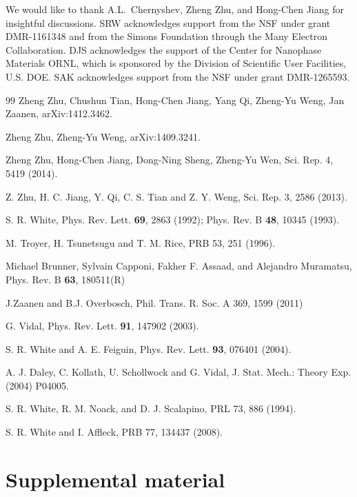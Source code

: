 \documentclass[aps,prb,twocolumn]{revtex4}
\begin{document}
We would like to thank A.L.~Chernyshev, 
%
Zheng Zhu, and Hong-Chen Jiang
for insightful discussions. SRW acknowledges support from
the NSF under grant DMR-1161348 and from the Simons Foundation through the Many Electron Collaboration. 
DJS acknowledges the support of the Center for 
Nanophase Materials
ORNL, which is sponsored by the Division of Scientific User Facilities, U.S. DOE.
SAK acknowledges support from the NSF under grant DMR-1265593.

\begin{thebibliography}{99}
  Zheng Zhu, Chushun Tian, Hong-Chen Jiang, Yang Qi, Zheng-Yu Weng, Jan Zaanen, arXiv:1412.3462.

  Zheng Zhu, Zheng-Yu Weng, arXiv:1409.3241.

 Zheng Zhu, Hong-Chen Jiang, Dong-Ning Sheng, Zheng-Yu Wen,  Sci. Rep. 4, 5419 (2014).

  Z. Zhu, H. C. Jiang, Y. Qi, C. S. Tian and Z. Y. Weng, Sci. Rep. 3, 2586 (2013).

 S. R. White, Phys. Rev. Lett. {\bf 69}, 2863 (1992); Phys. Rev. B {\bf 48}, 10345 (1993).

 M. Troyer, H. Tsunetsugu and T. M. Rice, PRB 53, 251 (1996).

 Michael Brunner, Sylvain Capponi, Fakher F. Assaad, and Alejandro Muramatsu, 
Phys. Rev. B {\bf 63}, 180511(R)

 J.Zaanen and B.J. Overbosch, Phil. Trans. R. Soc. A 369, 1599 (2011)

 G. Vidal, Phys. Rev. Lett. {\bf 91}, 147902 (2003).

 S. R. White and A. E. Feiguin, Phys. Rev. Lett. {\bf 93}, 076401 (2004).

 A. J. Daley, C. Kollath, U. Schollwock and G. Vidal, J. Stat. Mech.: Theory Exp. (2004) P04005.


 S. R. White, R. M. Noack, and D. J. Scalapino, PRL 73, 886 (1994).

 S. R. White and I. Affleck, PRB 77, 134437 (2008).

\end{thebibliography}

\appendix

\section {Supplemental material}
\end{document}
